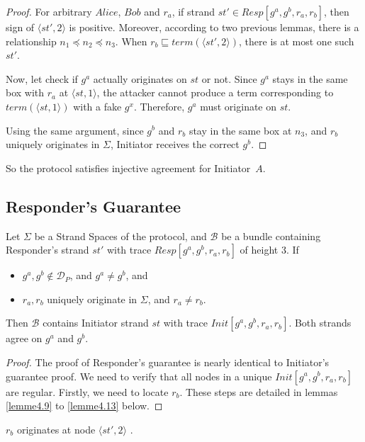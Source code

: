 \begin{proof}
For arbitrary $Alice$, $Bob$ and $r_a$, if strand $st' \in Resp[g^a,g^b,r_a,r_b]$, then sign of $\langle st',2 \rangle$ is positive. Moreover, according to two previous lemmas, there is a relationship $n_1 \preceq n_2 \preceq n_3$. When $r_b \sqsubseteq term(\langle st',2 \rangle )$, there is at most one such $st'$.

Now, let check if $g^a$ actually originates on $st$ or not. Since $g^a$ stays in the same box with $r_a$ at $\langle st,1 \rangle$, the attacker cannot produce a term corresponding to $term(\langle st,1 \rangle )$ with a fake $g^{x}$. Therefore, $g^a$ must originate on $st$. 

Using the same argument, since $g^b$ and $r_b$ stay in the same box at $n_3$, and $r_b$ uniquely originates in $\Sigma$, Initiator receives the correct $g^b$.
\end{proof}

So the protocol satisfies injective agreement for Initiator~$A$. 

\subsection{Responder's Guarantee }

\begin{Proposition}
Let $\Sigma$ be a Strand Spaces of the protocol, and $\mathcal{B}$ be a bundle containing Responder's strand $st'$ with trace $Resp[g^a,g^b,r_a,r_b]$ of height 3. If
\begin{itemize}
\item $g^a,g^b \not\in \mathcal{D}_P$, and $g^a \not= g^b$, and
\item $r_a,r_b$ uniquely originate in $\Sigma$, and $r_a \not= r_b$.
\end{itemize}
Then $\mathcal{B}$ contains Initiator strand $st$ with trace $Init[g^a,g^b,r_a,r_b]$. Both strands agree on $g^a$ and $g^b$.
\end{Proposition}

\begin{proof}
The proof of Responder's guarantee is nearly identical to Initiator's guarantee proof. We need to verify that all nodes in a unique $Init[g^a,g^b,r_a,r_b]$ are regular. Firstly, we need to locate $r_b$. These steps are detailed in lemmas \ref{lemme4.9} to \ref{lemme4.13} below.
\end{proof}

\begin{Lemma}\label{lemme4.9}
$r_b$ originates at node $\langle st',2 \rangle$ .
\end{Lemma} 

